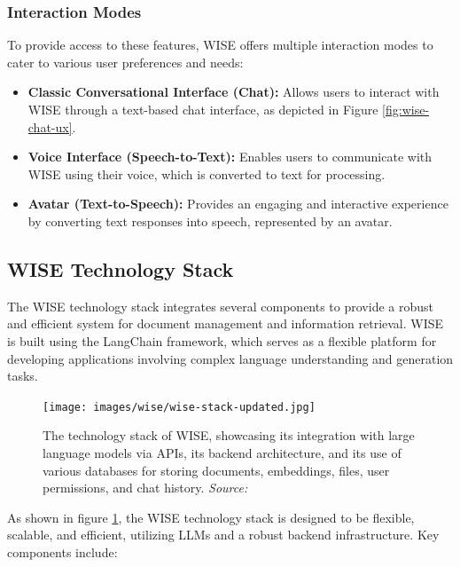 \subsubsection{Interaction Modes}
To provide access to these features, WISE offers multiple interaction modes to cater to various user preferences and needs:

\begin{itemize}
    \item \textbf{Classic Conversational Interface (Chat):} Allows users to interact with WISE through a text-based chat interface, as depicted in Figure \ref{fig:wise-chat-ux}.
    \item \textbf{Voice Interface (Speech-to-Text):} Enables users to communicate with WISE using their voice, which is converted to text for processing.
    \item \textbf{Avatar (Text-to-Speech):} Provides an engaging and interactive experience by converting text responses into speech, represented by an avatar.
\end{itemize}

\subsection{WISE Technology Stack}

The WISE technology stack integrates several components to provide a robust and efficient system for document management and information retrieval. WISE is built using the LangChain \cite{langchain2024} framework, which serves as a flexible platform for developing applications involving complex language understanding and generation tasks.

\begin{figure}[h!]
    \centering
    \texttt{[image: images/wise/wise-stack-updated.jpg]}
    \caption{The technology stack of WISE, showcasing its integration with large language models via APIs, its backend architecture, and its use of various databases for storing documents, embeddings, files, user permissions, and chat history. \textit{Source:} \cite{hpa2024}}
    \label{fig:wise-stack}
\end{figure}

As shown in figure \ref{fig:wise-stack}, the WISE technology stack is designed to be flexible, scalable, and efficient, utilizing LLMs and a robust backend infrastructure. Key components include:

